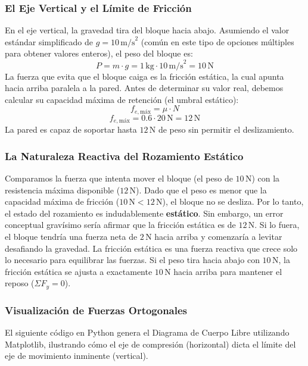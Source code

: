 \documentclass[12pt]{article}
\begin{document}
\subsubsection*{El Eje Vertical y el Límite de Fricción}
En el eje vertical, la gravedad tira del bloque hacia abajo. Asumiendo el valor estándar simplificado de $g = 10 \, \text{m/s}^2$ (común en este tipo de opciones múltiples para obtener valores enteros), el peso del bloque es:
\begin{equation}
    P = m \cdot g = 1 \, \text{kg} \cdot 10 \, \text{m/s}^2 = 10 \, \text{N}
\end{equation}
La fuerza que evita que el bloque caiga es la fricción estática, la cual apunta hacia arriba paralela a la pared. Antes de determinar su valor real, debemos calcular su capacidad máxima de retención (el umbral estático):
\begin{equation}
    f_{e,\text{máx}} = \mu \cdot N
\end{equation}
\begin{equation}
    f_{e,\text{máx}} = 0.6 \cdot 20 \, \text{N} = 12 \, \text{N}
\end{equation}
La pared es capaz de soportar hasta $12 \, \text{N}$ de peso sin permitir el deslizamiento.

\subsubsection*{La Naturaleza Reactiva del Rozamiento Estático}
Comparamos la fuerza que intenta mover el bloque (el peso de $10 \, \text{N}$) con la resistencia máxima disponible ($12 \, \text{N}$). Dado que el peso es menor que la capacidad máxima de fricción ($10 \, \text{N} < 12 \, \text{N}$), el bloque no se desliza. Por lo tanto, el estado del rozamiento es indudablemente \textbf{estático}.
Sin embargo, un error conceptual gravísimo sería afirmar que la fricción estática es de $12 \, \text{N}$. Si lo fuera, el bloque tendría una fuerza neta de $2 \, \text{N}$ hacia arriba y comenzaría a levitar desafiando la gravedad. La fricción estática es una fuerza reactiva que crece solo lo necesario para equilibrar las fuerzas. Si el peso tira hacia abajo con $10 \, \text{N}$, la fricción estática se ajusta a exactamente $10 \, \text{N}$ hacia arriba para mantener el reposo ($\Sigma F_y = 0$).

\subsubsection*{Visualización de Fuerzas Ortogonales}
El siguiente código en Python genera el Diagrama de Cuerpo Libre utilizando Matplotlib, ilustrando cómo el eje de compresión (horizontal) dicta el límite del eje de movimiento inminente (vertical).
\end{document}
